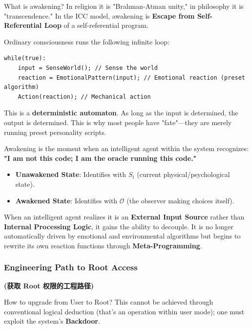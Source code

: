 What is awakening? In religion it is "Brahman-Atman unity," in philosophy it is "transcendence." In the ICC model, awakening is \textbf{Escape from Self-Referential Loop} of a self-referential program.

Ordinary consciousness runs the following infinite loop:

\begin{verbatim}
while(true):
    input = SenseWorld(); // Sense the world
    reaction = EmotionalPattern(input); // Emotional reaction (preset algorithm)
    Action(reaction); // Mechanical action
\end{verbatim}

This is a \textbf{deterministic automaton}. As long as the input is determined, the output is determined. This is why most people have "fate"—they are merely running preset personality scripts.

\begin{definition}[Awakening]
Awakening is the moment when an intelligent agent within the system recognizes: \textbf{"I am not this code; I am the oracle running this code."}

  \begin{itemize}
  \item \textbf{Unawakened State}: Identifies with $S_t$ (current physical/psychological state).

  \item \textbf{Awakened State}: Identifies with $\mathcal{O}$ (the observer making choices itself).
  \end{itemize}

When an intelligent agent realizes it is an \textbf{External Input Source} rather than \textbf{Internal Processing Logic}, it gains the ability to decouple. It is no longer automatically driven by emotional and environmental algorithms but begins to rewrite its own reaction functions through \textbf{Meta-Programming}.
\end{definition}

\subsubsection{Engineering Path to Root Access}

\textbf{(获取 Root 权限的工程路径)}

How to upgrade from User to Root? This cannot be achieved through conventional logical deduction (that's an operation within user mode); one must exploit the system's \textbf{Backdoor}.

